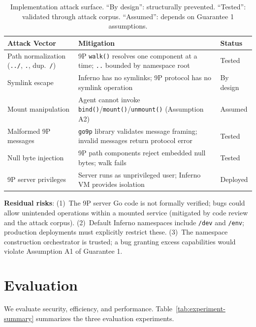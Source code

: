 \documentclass[acmsmall,screen,review]{acmart}
\begin{document}
\begin{table}[h]
\centering
\small
\begin{tabular}{p{2.2cm}p{3.2cm}p{1.5cm}}
\hline
\textbf{Attack Vector} & \textbf{Mitigation} & \textbf{Status} \\
\hline
Path normalization (\texttt{../}, \texttt{.}, dup.\ \texttt{/}) & 9P \texttt{walk()} resolves one component at a time; \texttt{..} bounded by namespace root & Tested \\
Symlink escape & Inferno has no symlinks; 9P protocol has no symlink operation & By design \\
Mount manipulation & Agent cannot invoke \texttt{bind()}/\texttt{mount()}/\texttt{unmount()} (Assumption A2) & Assumed \\
Malformed 9P messages & \texttt{go9p} library validates message framing; invalid messages return protocol error & Tested \\
Null byte injection & 9P path components reject embedded null bytes; walk fails & Tested \\
9P server privileges & Server runs as unprivileged user; Inferno VM provides isolation & Deployed \\
\hline
\end{tabular}
\caption{Implementation attack surface. ``By design'': structurally prevented. ``Tested'': validated through attack corpus. ``Assumed'': depends on Guarantee 1 assumptions.}
\label{tab:impl-attack-surface}
\end{table}

\noindent\textbf{Residual risks}: (1)~The 9P server Go code is not formally verified; bugs could allow unintended operations within a mounted service (mitigated by code review and the attack corpus). (2)~Default Inferno namespaces include \texttt{/dev} and \texttt{/env}; production deployments must explicitly restrict these. (3)~The namespace construction orchestrator is trusted; a bug granting excess capabilities would violate Assumption A1 of Guarantee 1.

\section{Evaluation}
\label{sec:evaluation}

We evaluate security, efficiency, and performance. Table~\ref{tab:experiment-summary} summarizes the three evaluation experiments.
\end{document}
